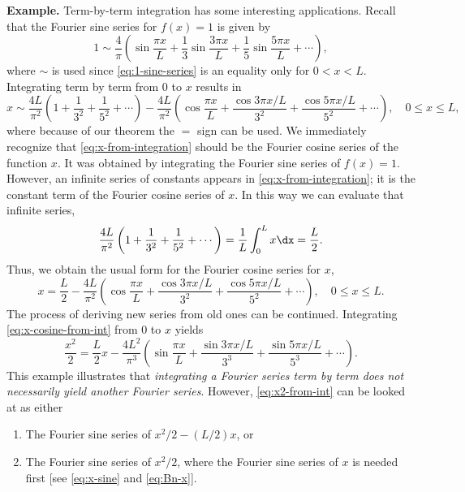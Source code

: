 \textbf{Example.}  Term-by-term integration has some interesting applications.  Recall that the Fourier sine series for $f(x) = 1$ is given by
\begin{equation}
\label{eq:1-sine-series}
1 \sim \frac{4}{\pi}\left(\sin\frac{\pi x}{L} + \frac{1}{3}\sin\frac{3\pi x}{L} + \frac{1}{5}\sin\frac{5\pi x}{L} + \cdots\right),
\end{equation}
where $\sim$ is used since \eqref{eq:1-sine-series} is an equality only for $0 < x < L$.  Integrating term by term from 0 to $x$ results in
\begin{equation}
\label{eq:x-from-integration}
x \sim \frac{4L}{\pi^2}\left(1 + \frac{1}{3^2} + \frac{1}{5^2} + \cdots \right) - \frac{4L}{\pi^2}\left(\cos\frac{\pi x}{L} + \frac{\cos 3\pi x/L}{3^2} + \frac{\cos 5\pi x/L}{5^2} + \cdots\right), \quad 0 \le x \le L,
\end{equation}
where because of our theorem the $=$ sign can be used.  We immediately recognize that \eqref{eq:x-from-integration} should be the Fourier cosine series of the function $x$.  It was obtained by integrating the Fourier sine series of $f(x) = 1$.  However, an infinite series of constants appears in \eqref{eq:x-from-integration}; it is the constant term of the Fourier cosine series of $x$.  In this way we can evaluate that infinite series,
\[
\frac{4L}{\pi^2}\left(1 + \frac{1}{3^2} + \frac{1}{5^2} + \cdots \right) = \frac{1}{L}\int_0^{L} x \dx = \frac{L}{2}.
\]
Thus, we obtain the usual form for the Fourier cosine series for $x$,
\begin{equation}
\label{eq:x-cosine-from-int}
x = \frac{L}{2} - \frac{4L}{\pi^2}\left(\cos\frac{\pi x}{L} + \frac{\cos 3\pi x/L}{3^2} + \frac{\cos 5\pi x/L}{5^2} + \cdots \right), \quad 0 \le x \le L.
\end{equation}
The process of deriving new series from old ones can be continued.  Integrating \eqref{eq:x-cosine-from-int} from 0 to $x$ yields
\begin{equation}
\label{eq:x2-from-int}
\frac{x^2}{2} = \frac{L}{2} x - \frac{4L^2}{\pi^3}\left(\sin\frac{\pi x}{L} + \frac{\sin 3\pi x/L}{3^3} + \frac{\sin 5\pi x/L}{5^3} + \cdots \right).
\end{equation}
This example illustrates that \textit{integrating a Fourier series term by term does not necessarily yield another Fourier series}.  However, \eqref{eq:x2-from-int} can be looked at as either
\begin{enumerate}
\item The Fourier sine series of $x^2/2 - (L/2)x$, or
\item The Fourier sine series of $x^2/2$, where the Fourier sine series of $x$ is needed first [see \eqref{eq:x-sine} and \eqref{eq:Bn-x}].
\end{enumerate}

